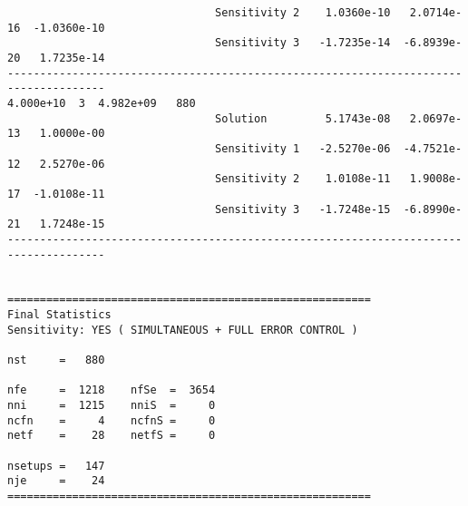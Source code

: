 \begin{verbatim}
                                Sensitivity 2    1.0360e-10   2.0714e-16  -1.0360e-10 
                                Sensitivity 3   -1.7235e-14  -6.8939e-20   1.7235e-14 
-------------------------------------------------------------------------------------
4.000e+10  3  4.982e+09   880
                                Solution         5.1743e-08   2.0697e-13   1.0000e-00 
                                Sensitivity 1   -2.5270e-06  -4.7521e-12   2.5270e-06 
                                Sensitivity 2    1.0108e-11   1.9008e-17  -1.0108e-11 
                                Sensitivity 3   -1.7248e-15  -6.8990e-21   1.7248e-15 
-------------------------------------------------------------------------------------


========================================================
Final Statistics
Sensitivity: YES ( SIMULTANEOUS + FULL ERROR CONTROL )

nst     =   880                

nfe     =  1218    nfSe  =  3654  
nni     =  1215    nniS  =     0  
ncfn    =     4    ncfnS =     0  
netf    =    28    netfS =     0

nsetups =   147                  
nje     =    24                  
========================================================
\end{verbatim}